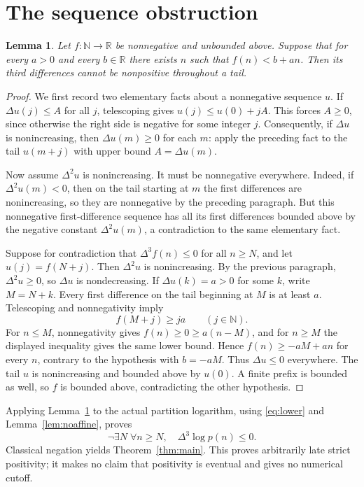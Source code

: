 \documentclass[11pt]{article}
\newtheorem{lemma}{Lemma}
\newcommand{\R}{\mathbb R}
\newcommand{\N}{\mathbb N}
\begin{document}
\section{The sequence obstruction}
\begin{lemma}\label{lem:sequence}
Let $f:\N\to\R$ be nonnegative and unbounded above. Suppose that for every $a>0$ and every $b\in\R$ there exists $n$ such that $f(n)<b+an$. Then its third differences cannot be nonpositive throughout a tail.
\end{lemma}
\begin{proof}
We first record two elementary facts about a nonnegative sequence $u$.
If $\Delta u(j)\le A$ for all $j$, telescoping gives
$u(j)\le u(0)+jA$. This forces $A\ge0$, since otherwise the right side is negative for some integer $j$.
Consequently, if $\Delta u$ is nonincreasing, then $\Delta u(m)\ge0$ for each $m$: apply the preceding fact to the tail $u(m+j)$ with upper bound $A=\Delta u(m)$.

Now assume $\Delta^2u$ is nonincreasing. It must be nonnegative everywhere. Indeed, if $\Delta^2u(m)<0$, then on the tail starting at $m$ the first differences are nonincreasing, so they are nonnegative by the preceding paragraph. But this nonnegative first-difference sequence has all its first differences bounded above by the negative constant $\Delta^2u(m)$, a contradiction to the same elementary fact.

Suppose for contradiction that $\Delta^3f(n)\le0$ for all $n\ge N$, and let $u(j)=f(N+j)$. Then $\Delta^2u$ is nonincreasing. By the previous paragraph, $\Delta^2u\ge0$, so $\Delta u$ is nondecreasing.
If $\Delta u(k)=a>0$ for some $k$, write $M=N+k$. Every first difference on the tail beginning at $M$ is at least $a$. Telescoping and nonnegativity imply
\[
f(M+j)\ge ja\qquad(j\in\N).
\]
For $n\le M$, nonnegativity gives $f(n)\ge0\ge a(n-M)$, and for $n\ge M$ the displayed inequality gives the same lower bound. Hence
$f(n)\ge-aM+an$ for every $n$, contrary to the hypothesis with $b=-aM$.
Thus $\Delta u\le0$ everywhere. The tail $u$ is nonincreasing and bounded above by $u(0)$. A finite prefix is bounded as well, so $f$ is bounded above, contradicting the other hypothesis.
\end{proof}
Applying Lemma~\ref{lem:sequence} to the actual partition logarithm, using \eqref{eq:lower} and Lemma~\ref{lem:noaffine}, proves
\[
\neg\exists N\;\forall n\ge N,\quad \Delta^3\log p(n)\le0.
\]
Classical negation yields Theorem~\ref{thm:main}. This proves arbitrarily late strict positivity; it makes no claim that positivity is eventual and gives no numerical cutoff.
\end{document}
